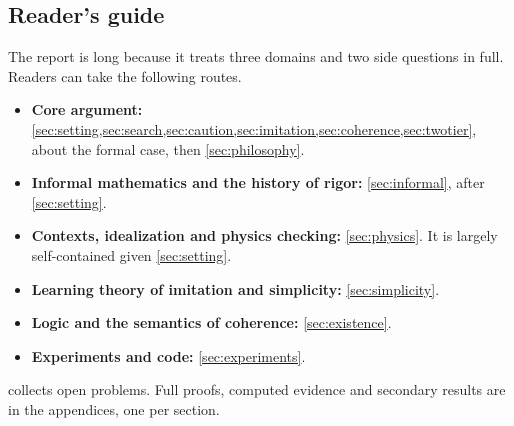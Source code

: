 \subsection{Reader's guide}\label{sec:intro:guide}

The report is long because it treats three domains and two side questions in full. Readers can take the following routes.
\begin{itemize}
\item \textbf{Core argument:} \cref{sec:setting,sec:search,sec:caution,sec:imitation,sec:coherence,sec:twotier}, about the formal case, then \cref{sec:philosophy}.
\item \textbf{Informal mathematics and the history of rigor:} \cref{sec:informal}, after \cref{sec:setting}.
\item \textbf{Contexts, idealization and physics checking:} \cref{sec:physics}. It is largely self-contained given \cref{sec:setting}.
\item \textbf{Learning theory of imitation and simplicity:} \cref{sec:simplicity}.
\item \textbf{Logic and the semantics of coherence:} \cref{sec:existence}.
\item \textbf{Experiments and code:} \cref{sec:experiments}.
\end{itemize}
 collects open problems. Full proofs, computed evidence and secondary results are in the appendices, one per section.
